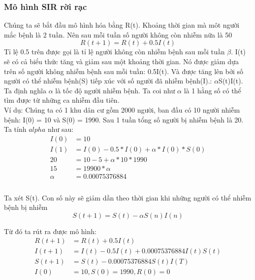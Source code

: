 \documentclass[a4paper]{article}
\begin{document}
\subsubsection{Mô hình SIR rời rạc}
Chúng ta sẽ bắt đầu mô hình hóa bằng R(t). Khoảng thời gian mà môt người mắc bệnh là 2 tuần. Nên sau mỗi tuần số người không còn nhiễm nữa là 50%
\begin{equation}
R(t+1) = R(t) + 0.5I(t)
\end{equation}
Tỉ lệ 0.5 trên được gọi là tỉ lệ người không còn nhiễm bệnh sau mỗi tuần $\beta$.
I(t) sẽ có cả biểu thức tăng và giảm sau một khoảng thời gian. Nó được giảm dựa trên số người không nhiễm bệnh sau mỗi tuần: 0.5I(t). Và được tăng lên bởi số người có thể nhiễm bệnh(S) tiếp xúc với số người đã nhiễm bệnh(I).: $\alpha$S(t)I(t). Ta định nghĩa $\alpha$ là tốc độ người nhiễm bệnh. Ta coi như $\alpha$ là 1 hằng số có thể tìm được từ những ca nhiễm đầu tiên.
\\
Ví dụ: Chúng ta có 1 khu dân cư gồm 2000 người, ban đầu có 10 người nhiễm bệnh: I(0) = 10 và S(0) = 1990. Sau 1 tuần tổng số người bị nhiễm bệnh là 20. Ta tính $alpha$ như sau:
\begin{equation}
\begin{split}
I(0) &= 10 \\
I(1) &= I(0) - 0.5*I(0) + \alpha *I(0)*S(0) \\
20 &= 10 - 5 + \alpha *10*1990 \\
15 &= 19900*\alpha \\
\alpha &= 0.00075376884 \\
\end{split}
\end{equation}
\\
Ta xét S(t). Con số này sẽ giảm dần theo thời gian khi những người có thể nhiễm bệnh bị nhiễm
\begin{equation}
S(t+1) = S(t) - \alpha S(n)I(n)
\end{equation}

Từ đó ta rút ra được mô hình:
\begin{equation}
\begin{split}
R(t+1) &= R(t) + 0.5I(t) \\
I(t+1) &= I(t) - 0.5I(t) + 0.00075376884I(t)S(t) \\
S(t+1) &= S(t) - 0.00075376884S(t)I(T) \\
I(0) &= 10, S(0) = 1990, R(0) = 0
\end{split}
\end{equation}
\end{document}
